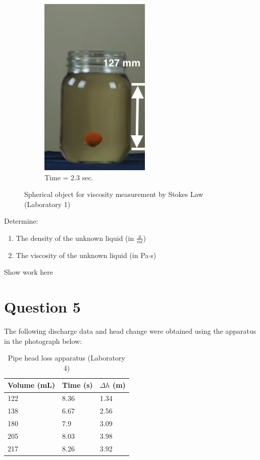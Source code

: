 \documentclass[12pt]{article}
\begin{document}
\begin{figure}[h!]
\begin{subfigure}{.3\textwidth}
  \label{fig:sub2}
\end{subfigure}
\begin{subfigure}{.3\textwidth}
  \centering
  \includegraphics[width=.4\linewidth]{end.png}
  \caption{Time = 2.3 sec.}
  \label{fig:sub2}
\end{subfigure}
\caption{Spherical object for viscosity measurement by Stokes Law (Laboratory 1)}
\label{fig:test}
\end{figure}
Determine:
\begin{enumerate}
\item The density of the unknown liquid (in $\frac{g}{ml}$)
\item The viscosity of the unknown liquid (in Pa$\cdot$s)
\end{enumerate}
\clearpage
Show work here
\clearpage
\section*{Question 5}
The following discharge data and head change were obtained using the apparatus in the photograph below:

\begin{table}[h!]
    \centering
    \caption{Pipe head loss apparatus (Laboratory 4)}
    \begin{tabular}{p{1in} p{1in} p{1in}}
    Volume (mL) & Time (s) & $\Delta h$ (m) \\
    \hline
    122&8.36&1.34\\
    138&6.67&2.56\\
    180&7.9&3.09\\
    205&8.03&3.98\\
    217&8.26&3.92\\
    \end{tabular}
    \label{tab:table1}
\end{table}
\end{document}
